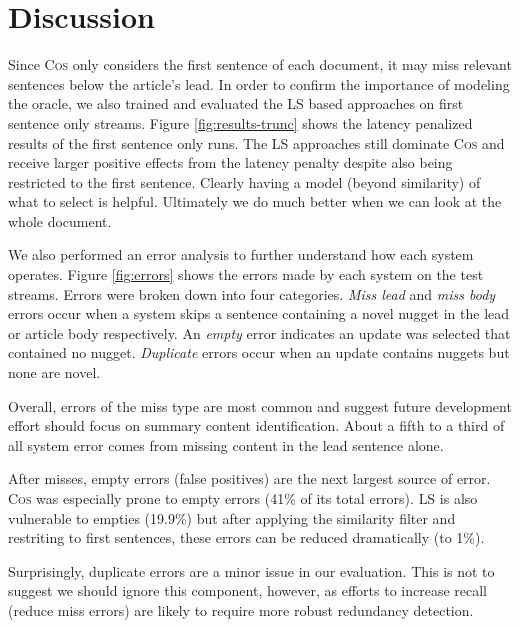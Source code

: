 \section{Discussion} \label{sec:discussion}

  Since \textsc{Cos} only considers the first sentence of each document, it
 may miss relevant sentences below the article's lead. In order to confirm the
 importance of modeling the oracle, we also trained and evaluated the
 \textsc{LS} based approaches on first sentence only streams. Figure
 \ref{fig:results-trunc} shows the latency penalized results of the first
 sentence only runs.  The \textsc{LS} approaches still dominate \textsc{Cos}
 and receive larger positive effects from the latency penalty despite also
 being restricted to the first sentence. Clearly having a model (beyond
 similarity) of what to select is helpful. Ultimately we do much better when
 we can look at the whole document.
  
  We also performed an error analysis to further understand how each system
 operates.  Figure \ref{fig:errors} shows the errors made by each system on
 the test streams.  Errors were broken down into four categories. \emph{Miss
 lead} and \emph{miss body} errors occur when a system skips a sentence
 containing a novel nugget in the lead or article body respectively. An
 \emph{empty} error indicates an update was selected that contained no nugget.
 \emph{Duplicate} errors occur when an update contains nuggets but none are
 novel. 
 
  Overall, errors of the miss type are most common and suggest future
 development effort should focus on summary content identification.  About a
 fifth to a third of all system error comes from missing content in the lead
 sentence alone.
 
  After misses, empty errors (false positives) are the next largest source of
 error. \textsc{Cos} was especially prone to empty errors (41\% of its total
 errors). \textsc{LS} is also vulnerable to empties (19.9\%) but after
 applying the similarity filter and restriting to first sentences, these
 errors can be reduced dramatically (to 1\%).
  
  Surprisingly, duplicate errors are a minor issue in our evaluation. This is
 not to suggest we should ignore this component, however, as efforts to
 increase recall (reduce miss errors) are likely to require more robust
 redundancy detection. 


